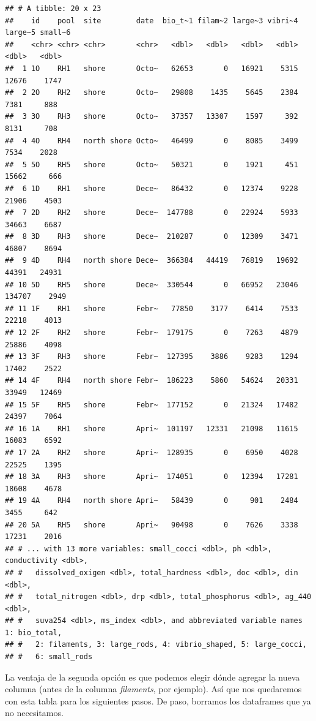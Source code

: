 \documentclass[
]{book}
\begin{document}
\begin{verbatim}
## # A tibble: 20 x 23
##    id    pool  site        date  bio_t~1 filam~2 large~3 vibri~4 large~5 small~6
##    <chr> <chr> <chr>       <chr>   <dbl>   <dbl>   <dbl>   <dbl>   <dbl>   <dbl>
##  1 1O    RH1   shore       Octo~   62653       0   16921    5315   12676    1747
##  2 2O    RH2   shore       Octo~   29808    1435    5645    2384    7381     888
##  3 3O    RH3   shore       Octo~   37357   13307    1597     392    8131     708
##  4 4O    RH4   north shore Octo~   46499       0    8085    3499    7534    2028
##  5 5O    RH5   shore       Octo~   50321       0    1921     451   15662     666
##  6 1D    RH1   shore       Dece~   86432       0   12374    9228   21906    4503
##  7 2D    RH2   shore       Dece~  147788       0   22924    5933   34663    6687
##  8 3D    RH3   shore       Dece~  210287       0   12309    3471   46807    8694
##  9 4D    RH4   north shore Dece~  366384   44419   76819   19692   44391   24931
## 10 5D    RH5   shore       Dece~  330544       0   66952   23046  134707    2949
## 11 1F    RH1   shore       Febr~   77850    3177    6414    7533   22218    4013
## 12 2F    RH2   shore       Febr~  179175       0    7263    4879   25886    4098
## 13 3F    RH3   shore       Febr~  127395    3886    9283    1294   17402    2522
## 14 4F    RH4   north shore Febr~  186223    5860   54624   20331   33949   12469
## 15 5F    RH5   shore       Febr~  177152       0   21324   17482   24397    7064
## 16 1A    RH1   shore       Apri~  101197   12331   21098   11615   16083    6592
## 17 2A    RH2   shore       Apri~  128935       0    6950    4028   22525    1395
## 18 3A    RH3   shore       Apri~  174051       0   12394   17281   18608    4678
## 19 4A    RH4   north shore Apri~   58439       0     901    2484    3455     642
## 20 5A    RH5   shore       Apri~   90498       0    7626    3338   17231    2016
## # ... with 13 more variables: small_cocci <dbl>, ph <dbl>, conductivity <dbl>,
## #   dissolved_oxigen <dbl>, total_hardness <dbl>, doc <dbl>, din <dbl>,
## #   total_nitrogen <dbl>, drp <dbl>, total_phosphorus <dbl>, ag_440 <dbl>,
## #   suva254 <dbl>, ms_index <dbl>, and abbreviated variable names 1: bio_total,
## #   2: filaments, 3: large_rods, 4: vibrio_shaped, 5: large_cocci,
## #   6: small_rods
\end{verbatim}

La ventaja de la segunda opción es que podemos elegir dónde agregar la nueva columna (antes de la columna \emph{filaments}, por ejemplo). Así que nos quedaremos con esta tabla para los siguientes pasos. De paso, borramos los dataframes que ya no necesitamos.
\end{document}
